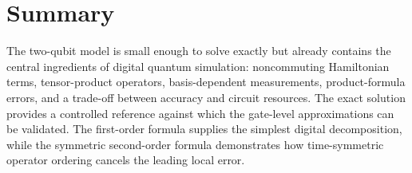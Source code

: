 \documentclass[11pt,a4paper]{article}
\begin{document}
\section{Summary}

The two-qubit model is small enough to solve exactly but already contains the central ingredients of digital quantum simulation: noncommuting Hamiltonian terms, tensor-product operators, basis-dependent measurements, product-formula errors, and a trade-off between accuracy and circuit resources. The exact solution provides a controlled reference against which the gate-level approximations can be validated. The first-order formula supplies the simplest digital decomposition, while the symmetric second-order formula demonstrates how time-symmetric operator ordering cancels the leading local error.
\end{document}
